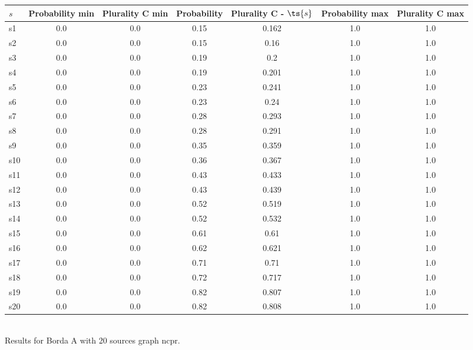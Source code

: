 \documentclass{article}
\begin{document}
\noindent\begin{tabular}{|l|c|c|c|c|c|c|}
\hline
$s$& Probability min & Plurality C min & Probability & Plurality C - $\ts{s}$ & Probability max & Plurality C max\\
\hline
s1 &0.0 & 0.0 & 0.15 & 0.162 & 1.0 & 1.0\\
\hline
s2 &0.0 & 0.0 & 0.15 & 0.16 & 1.0 & 1.0\\
\hline
s3 &0.0 & 0.0 & 0.19 & 0.2 & 1.0 & 1.0\\
\hline
s4 &0.0 & 0.0 & 0.19 & 0.201 & 1.0 & 1.0\\
\hline
s5 &0.0 & 0.0 & 0.23 & 0.241 & 1.0 & 1.0\\
\hline
s6 &0.0 & 0.0 & 0.23 & 0.24 & 1.0 & 1.0\\
\hline
s7 &0.0 & 0.0 & 0.28 & 0.293 & 1.0 & 1.0\\
\hline
s8 &0.0 & 0.0 & 0.28 & 0.291 & 1.0 & 1.0\\
\hline
s9 &0.0 & 0.0 & 0.35 & 0.359 & 1.0 & 1.0\\
\hline
s10 &0.0 & 0.0 & 0.36 & 0.367 & 1.0 & 1.0\\
\hline
s11 &0.0 & 0.0 & 0.43 & 0.433 & 1.0 & 1.0\\
\hline
s12 &0.0 & 0.0 & 0.43 & 0.439 & 1.0 & 1.0\\
\hline
s13 &0.0 & 0.0 & 0.52 & 0.519 & 1.0 & 1.0\\
\hline
s14 &0.0 & 0.0 & 0.52 & 0.532 & 1.0 & 1.0\\
\hline
s15 &0.0 & 0.0 & 0.61 & 0.61 & 1.0 & 1.0\\
\hline
s16 &0.0 & 0.0 & 0.62 & 0.621 & 1.0 & 1.0\\
\hline
s17 &0.0 & 0.0 & 0.71 & 0.71 & 1.0 & 1.0\\
\hline
s18 &0.0 & 0.0 & 0.72 & 0.717 & 1.0 & 1.0\\
\hline
s19 &0.0 & 0.0 & 0.82 & 0.807 & 1.0 & 1.0\\
\hline
s20 &0.0 & 0.0 & 0.82 & 0.808 & 1.0 & 1.0\\
\hline
\end{tabular}\\

\noindent Results for Borda A with 20 sources graph ncpr.
\end{document}
